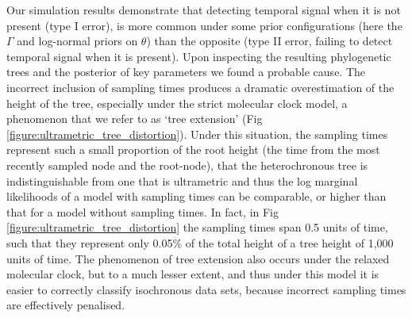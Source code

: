 \documentclass[10pt,letterpaper]{article}
\begin{document}
Our simulation results demonstrate that detecting temporal signal when it is not present (type I error), is more common under some prior configurations (here the $\Gamma$ and log-normal priors on $\theta$) than the opposite (type II error, failing to detect temporal signal when it is present). Upon inspecting the resulting phylogenetic trees and the posterior of key parameters we found a probable cause. The incorrect inclusion of sampling times produces a dramatic overestimation of the height of the tree, especially under the strict molecular clock model, a phenomenon that we refer to as `tree extension' (Fig \ref{figure:ultrametric_tree_distortion}). Under this situation, the sampling times represent such a small proportion of the root height (the time from the most recently sampled node and the root-node), that the heterochronous tree is indistinguishable from one that is ultrametric and thus the log marginal likelihoods of a model with sampling times can be comparable, or higher than that for a model without sampling times. In fact, in Fig \ref{figure:ultrametric_tree_distortion} the sampling times span 0.5 units of time, such that they represent only 0.05\% of the total height of a tree height of 1,000 units of time. The phenomenon of tree extension also occurs under the relaxed molecular clock, but to a much lesser extent, and thus under this model it is easier to correctly classify isochronous data sets, because incorrect sampling times are effectively penalised. 
\end{document}
